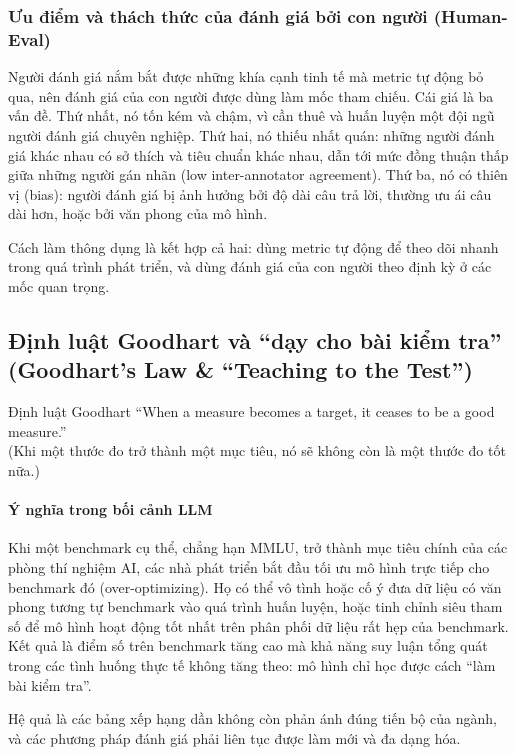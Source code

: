 \subsubsection{Ưu điểm và thách thức của đánh giá bởi con người (Human-Eval)}
Người đánh giá nắm bắt được những khía cạnh tinh tế mà metric tự động bỏ qua, nên đánh giá của con người được dùng làm mốc tham chiếu. Cái giá là ba vấn đề. Thứ nhất, nó tốn kém và chậm, vì cần thuê và huấn luyện một đội ngũ người đánh giá chuyên nghiệp. Thứ hai, nó thiếu nhất quán: những người đánh giá khác nhau có sở thích và tiêu chuẩn khác nhau, dẫn tới mức đồng thuận thấp giữa những người gán nhãn (low inter-annotator agreement). Thứ ba, nó có thiên vị (bias): người đánh giá bị ảnh hưởng bởi độ dài câu trả lời, thường ưu ái câu dài hơn, hoặc bởi văn phong của mô hình.

Cách làm thông dụng là kết hợp cả hai: dùng metric tự động để theo dõi nhanh trong quá trình phát triển, và dùng đánh giá của con người theo định kỳ ở các mốc quan trọng.

\subsection{Định luật Goodhart và “dạy cho bài kiểm tra” (Goodhart's Law \& ``Teaching to the Test'')}
\label{ssec:goodharts_law}

\begin{keyidea}{Định luật Goodhart}
“When a measure becomes a target, it ceases to be a good measure.” \\ (Khi một thước đo trở thành một mục tiêu, nó sẽ không còn là một thước đo tốt nữa.)
\end{keyidea}

\paragraph{Ý nghĩa trong bối cảnh LLM}
Khi một benchmark cụ thể, chẳng hạn MMLU, trở thành mục tiêu chính của các phòng thí nghiệm AI, các nhà phát triển bắt đầu tối ưu mô hình trực tiếp cho benchmark đó (over-optimizing). Họ có thể vô tình hoặc cố ý đưa dữ liệu có văn phong tương tự benchmark vào quá trình huấn luyện, hoặc tinh chỉnh siêu tham số để mô hình hoạt động tốt nhất trên phân phối dữ liệu rất hẹp của benchmark. Kết quả là điểm số trên benchmark tăng cao mà khả năng suy luận tổng quát trong các tình huống thực tế không tăng theo: mô hình chỉ học được cách “làm bài kiểm tra”.

Hệ quả là các bảng xếp hạng dần không còn phản ánh đúng tiến bộ của ngành, và các phương pháp đánh giá phải liên tục được làm mới và đa dạng hóa.